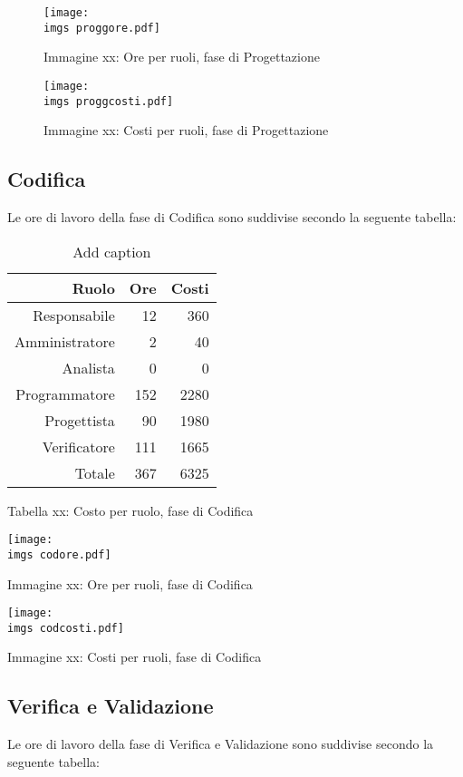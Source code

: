 \begin{figure}
\texttt{[image: \\imgs proggore.pdf]}
\caption{Immagine xx: Ore per ruoli, fase di Progettazione}
\end{figure}

\begin{figure}
\texttt{[image: \\imgs proggcosti.pdf]}
\caption{Immagine xx: Costi per ruoli, fase di Progettazione}
\end{figure}

\subsection{Codifica}
Le ore di lavoro della fase di Codifica sono suddivise secondo la seguente tabella:

\begin{table}[htbp]
  \centering
  \caption{Add caption}
    \begin{tabular}{rrr}
    \toprule
    Ruolo & Ore   & Costi \\
    \midrule
    Responsabile & 12    & 360 \\
    Amministratore & 2     & 40 \\
    Analista & 0     & 0 \\
    Programmatore & 152   & 2280 \\
    Progettista & 90    & 1980 \\
    Verificatore & 111   & 1665 \\
    Totale & 367   & 6325 \\
    \bottomrule
    \end{tabular}%
  \label{tab:addlabel}%
\end{table}%
\caption{Tabella xx: Costo per ruolo, fase di Codifica}

\texttt{[image: \\imgs codore.pdf]}
\caption{Immagine xx: Ore per ruoli, fase di Codifica}

\texttt{[image: \\imgs codcosti.pdf]}
\caption{Immagine xx: Costi per ruoli, fase di Codifica}

\subsection{Verifica e Validazione}
Le ore di lavoro della fase di Verifica e Validazione sono suddivise secondo la seguente tabella:


